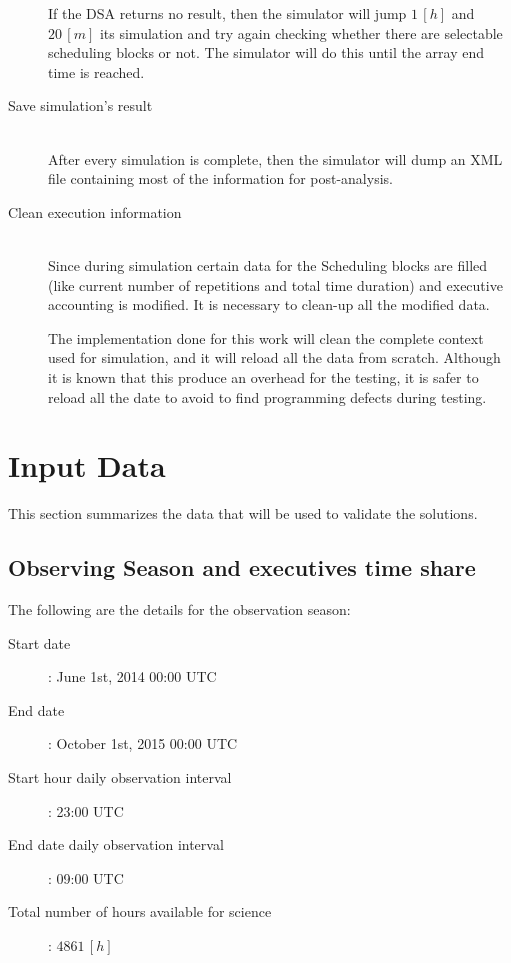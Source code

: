 \begin{description}
If the DSA returns no result, then the simulator will jump $1\,[h]$ and $20\,[m]$ its simulation and try again checking whether there are selectable scheduling blocks or not. The simulator will do this until the array end time is reached.

\item[Save simulation's result] \hfill \\
After every simulation is complete, then the simulator will dump an XML file containing most of the information for post-analysis.

\item[Clean execution information] \hfill \\
Since during simulation certain data for the Scheduling blocks are filled (like current number of repetitions and total time duration) and executive accounting is modified. It is necessary to clean-up all the modified data. 

The implementation done for this work will clean the complete context used for simulation, and it will reload all the data from scratch. Although it is known that this produce an overhead for the testing, it is safer to reload all the date to avoid to find programming defects during testing.

\end{description}

\section {Input Data}
\label{sec:input-data}
This section summarizes the data that will be used to validate the solutions. 

\subsection{Observing Season and executives time share}

The following are the details for the observation season:

\begin{description}
\item[Start date]: June 1st, 2014 00:00 UTC 
\item[End date]: October 1st, 2015 00:00 UTC
\item[Start hour daily observation interval]: 23:00 UTC
\item[End date daily observation interval]: 09:00 UTC
\item[Total number of hours available for science]: $4861\,[h]$
\end{description}

